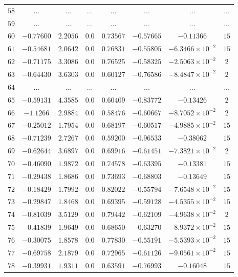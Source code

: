 \begin{landscape}
\begin{center}
\begin{longtable}{lccccccc}
$58$ & ... & ... & ... & ... & ... & ... & ... \\
$59$ & ... & ... & ... & ... & ... & ... & ... \\
$60$ & $-0.77600$ & $ 2.2056$ & $0.0$ & $ 0.73567$ & $-0.57665$ & $-0.11366$ & $15$ \\
$61$ & $-0.54681$ & $ 2.0642$ & $0.0$ & $ 0.76831$ & $-0.55805$ & $-6.3466\times{}10^{-2}$ & $15$ \\
$62$ & $-0.71175$ & $ 3.3086$ & $0.0$ & $ 0.76525$ & $-0.58325$ & $-2.5063\times{}10^{-2}$ & $2$ \\
$63$ & $-0.64430$ & $ 3.6303$ & $0.0$ & $ 0.60127$ & $-0.76586$ & $-8.4847\times{}10^{-2}$ & $2$ \\
$64$ & ... & ... & ... & ... & ... & ... & ... \\
$65$ & $-0.59131$ & $ 4.3585$ & $0.0$ & $ 0.60409$ & $-0.83772$ & $-0.13426$ & $2$ \\
$66$ & $-1.1266$ & $ 2.9884$ & $0.0$ & $ 0.58476$ & $-0.60667$ & $-8.7052\times{}10^{-2}$ & $2$ \\
$67$ & $-0.25012$ & $ 1.7954$ & $0.0$ & $ 0.68197$ & $-0.60517$ & $-4.9885\times{}10^{-2}$ & $15$ \\
$68$ & $-0.71239$ & $ 2.7267$ & $0.0$ & $ 0.59200$ & $-0.96533$ & $-0.38062$ & $15$ \\
$69$ & $-0.62644$ & $ 3.6897$ & $0.0$ & $ 0.69916$ & $-0.61451$ & $-7.3821\times{}10^{-2}$ & $2$ \\
$70$ & $-0.46090$ & $ 1.9872$ & $0.0$ & $ 0.74578$ & $-0.63395$ & $-0.13381$ & $15$ \\
$71$ & $-0.29438$ & $ 1.8686$ & $0.0$ & $ 0.73693$ & $-0.68803$ & $-0.13649$ & $15$ \\
$72$ & $-0.18429$ & $ 1.7992$ & $0.0$ & $ 0.82022$ & $-0.55794$ & $-7.6548\times{}10^{-2}$ & $15$ \\
$73$ & $-0.29847$ & $ 1.8468$ & $0.0$ & $ 0.69395$ & $-0.59128$ & $-4.5355\times{}10^{-2}$ & $15$ \\
$74$ & $-0.81039$ & $ 3.5129$ & $0.0$ & $ 0.79442$ & $-0.62109$ & $-4.9638\times{}10^{-2}$ & $2$ \\
$75$ & $-0.41839$ & $ 1.9649$ & $0.0$ & $ 0.68650$ & $-0.63270$ & $-8.9372\times{}10^{-2}$ & $15$ \\
$76$ & $-0.30075$ & $ 1.8578$ & $0.0$ & $ 0.77830$ & $-0.55191$ & $-5.5393\times{}10^{-2}$ & $15$ \\
$77$ & $-0.69758$ & $ 2.1879$ & $0.0$ & $ 0.72965$ & $-0.61126$ & $-9.0561\times{}10^{-2}$ & $15$ \\
$78$ & $-0.39931$ & $ 1.9311$ & $0.0$ & $ 0.63591$ & $-0.76993$ & $-0.16048$ & $15$ \\

\end{longtable}
\end{center}
\end{landscape}
